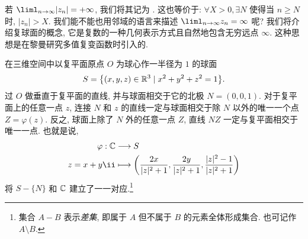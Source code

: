 若 $\liml_{n\ra\infty}|z_n|=+\infty$, 我们将其记为 .
这也等价于: $\forall X>0,\exists N$ 使得当 $n\ge N$ 时, $|z_n|>X$.
我们能不能也用邻域的语言来描述 $\liml_{n\ra\infty}z_n=\infty$ 呢?
我们将介绍复球面的概念, 它是复数的一种几何表示方式且自然地包含无穷远点 $\infty$.
这种思想是在黎曼研究多值复变函数时引入的.

在三维空间中以复平面原点 $O$ 为球心作一半径为 $1$ 的球面
\[
  S={\left\{(x,y,z)\in{\mathbb{R}}^3\mid x^2+y^2+z^2=1\right\}}.
\]
过 $O$ 做垂直于复平面的直线, 并与球面相交于它的北极 $N=(0,0,1)$.
对于复平面上的任意一点 $z$, 连接 $N$ 和 $z$ 的直线一定与球面相交于除 $N$ 以外的唯一一个点 $Z=\varphi(z)$.
反之, 球面上除了 $N$ 外的任意一点 $Z$, 直线 $NZ$ 一定与复平面相交于唯一一点.
也就是说, 
\begin{equation}
  \label{eq:polar-project}
  \begin{aligned}
    \varphi:\BC&\lra S\\
    z=x+y\ii&\lto \biggl(\frac{2x}{|z|^2+1},\frac{2y}{|z|^2+1},\frac{|z|^2-1}{|z|^2+1}\biggr)
  \end{aligned}
\end{equation}
将 $S-\{N\}$ 和 ${\mathbb{C}}$ 建立了一一对应.\footnote{
  集合 $A-B$ 表示\emph{差集}, 即属于 $A$ 但不属于 $B$ 的元素全体形成集合.
  也可记作 $A\setminus B$.
}

